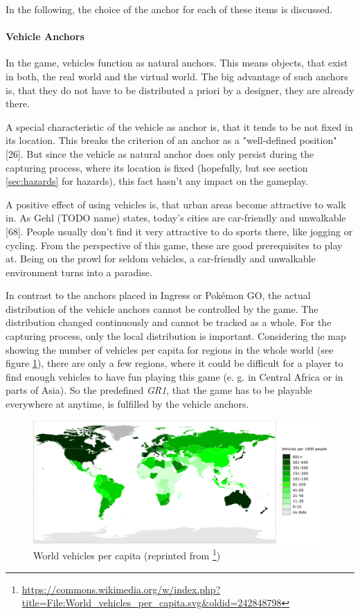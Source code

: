 In the following, the choice of the anchor for each of these items is discussed.

\paragraph{Vehicle Anchors}
In the game, vehicles function as natural anchors. This means objects, that exist in both, the real world and the virtual world. The big advantage of such anchors is, that they do not have to be distributed a priori by a designer, they are already there.

A special characteristic of the vehicle as anchor is, that it tends to be not fixed in its location. This breaks the criterion of an anchor as a "well-defined position" [26]. But since the vehicle as natural anchor does only persist during the capturing process, where its location is fixed (hopefully, but see section \ref{sec:hazards} for hazards), this fact hasn't any impact on the gameplay.

A positive effect of using vehicles is, that urban areas become attractive to walk in. As Gehl (TODO name) states, today’s cities are car-friendly and unwalkable [68]. People usually don’t find it very attractive to do sports there, like jogging or cycling. From the perspective of this game, these are good prerequisites to play at. Being on the prowl for seldom vehicles, a car-friendly and unwalkable environment turns into a paradise.

In contrast to the anchors placed in Ingress or Pokémon GO, the actual distribution of the vehicle anchors cannot be controlled by the game. The distribution changed continuously and cannot be tracked as a whole. For the capturing process, only the local distribution is important. Considering the map showing the number of vehicles per capita for regions in the whole world (see figure \ref{fig:worldVehicles}), there are only a few regions, where it could be difficult for a player to find enough vehicles to have fun playing this game (e. g. in Central Africa or in parts of Asia). So the predefined \emph{GR1}, that the game has to be playable everywhere at anytime, is fulfilled by the vehicle anchors.

\begin{figure}[bth]
  \centering
        \includegraphics[width=.95\linewidth]{gfx/world_vehicles_per_capita}
        \caption{World vehicles per capita (reprinted from \footnote{\url{https://commons.wikimedia.org/w/index.php?title=File:World_vehicles_per_capita.svg&oldid=242848798}})}
        \label{fig:worldVehicles}
\end{figure}

